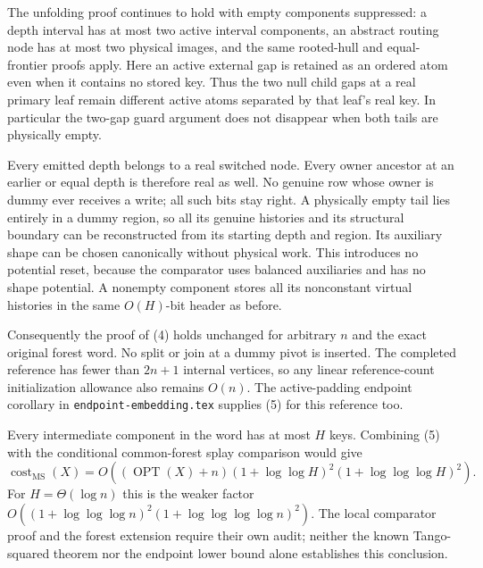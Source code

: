 \documentclass[11pt]{article}
\newcommand{\cost}{\operatorname{cost}}
\newcommand{\OPT}{\operatorname{OPT}}
\newcommand{\MS}{\mathrm{MS}}
\begin{document}
The unfolding proof continues to hold with empty components suppressed:
a depth interval has at most two active interval components, an
abstract routing node has at most two physical images, and the same
rooted-hull and equal-frontier proofs apply. Here an active external
gap is retained as an ordered atom even when it contains no stored
key. Thus the two null child gaps at a real primary leaf remain
different active atoms separated by that leaf's real key. In
particular the two-gap guard argument does not disappear when both
tails are physically empty.

Every emitted depth belongs to a real switched node. Every owner
ancestor at an earlier or equal depth is therefore real as well.
No genuine row whose owner is dummy ever receives a write; all such
bits stay right. A physically empty tail lies entirely in a dummy
region, so all its genuine histories and its structural boundary can
be reconstructed from its starting depth and region. Its auxiliary
shape can be chosen canonically without physical work. This introduces
no potential reset, because the comparator uses balanced auxiliaries
and has no shape potential. A nonempty component stores all its
nonconstant virtual histories in the same $O(H)$-bit header as before.

Consequently the proof of (4) holds unchanged for arbitrary $n$ and
the exact original forest word. No split or join at a dummy pivot is
inserted. The completed reference has fewer than $2n+1$ internal
vertices, so any linear reference-count initialization allowance also
remains $O(n)$. The active-padding endpoint corollary in
\texttt{endpoint-embedding.tex} supplies (5) for this reference too.

Every intermediate component in the word has at most $H$ keys.
Combining (5) with the conditional common-forest splay comparison
would give
\[
 \cost_{\MS}(X)=
 O\!\left((\OPT(X)+n)
     (1+\log\log H)^2
     (1+\log\log\log H)^2\right).
\]
For $H=\Theta(\log n)$ this is the weaker factor
$O((1+\log\log\log n)^2
    (1+\log\log\log\log n)^2)$.
The local comparator proof and the forest extension require their
own audit; neither the known Tango-squared theorem nor the endpoint
lower bound alone establishes this conclusion.
\end{document}
